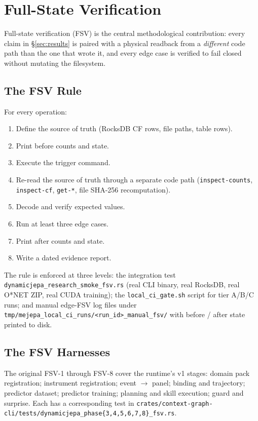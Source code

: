 \documentclass[10pt,twocolumn,letterpaper]{article}
\newcommand{\code}[1]{\texttt{\small #1}}
\begin{document}
\section{Full-State Verification}
\label{sec:fsv}

Full-state verification (FSV) is the central methodological
contribution: every claim in \S\ref{sec:results} is paired with a
physical readback from a \emph{different} code path than the one
that wrote it, and every edge case is verified to fail closed
without mutating the filesystem.

\subsection{The FSV Rule}

For every operation:
\begin{enumerate}[leftmargin=1.2em]
\item Define the source of truth (RocksDB CF rows, file paths,
      table rows).
\item Print before counts and state.
\item Execute the trigger command.
\item Re-read the source of truth through a separate code path
      (\code{inspect-counts}, \code{inspect-cf}, \code{get-*},
      file SHA-256 recomputation).
\item Decode and verify expected values.
\item Run at least three edge cases.
\item Print after counts and state.
\item Write a dated evidence report.
\end{enumerate}

The rule is enforced at three levels: the integration test
\code{dynamicjepa\_research\_smoke\_fsv.rs} (real CLI binary, real
RocksDB, real O*NET ZIP, real CUDA training); the
\code{local\_ci\_gate.sh} script for tier A/B/C runs; and manual
edge-FSV log files under
\code{tmp/mejepa\_local\_ci\_runs/<run\_id>\_manual\_fsv/} with
before / after state printed to disk.

\subsection{The FSV Harnesses}

The original FSV-1 through FSV-8 cover the runtime's v1 stages:
domain pack registration; instrument registration; event $\to$
panel; binding and trajectory; predictor dataset; predictor
training; planning and skill execution; guard and surprise. Each
has a corresponding test in
\code{crates/context-graph-cli/}\-\code{tests/dynamicjepa\_phase}\linebreak[1]\code{\{3,4,5,6,7,8\}\_fsv.rs}.
\end{document}
